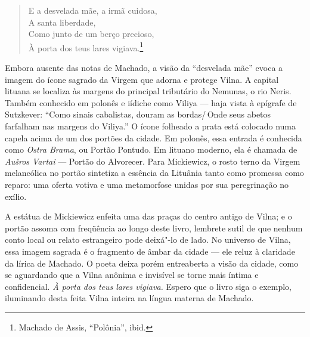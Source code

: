 \begin{verse}
E a desvelada mãe, a irmã cuidosa,\\
A santa liberdade,\\
Como junto de um berço precioso,\\
À porta dos teus lares vigiava.\footnote{Machado de Assis, ``Polônia'', ibid.}
\end{verse}

Embora ausente das notas de Machado, a visão da ``desvelada mãe'' evoca
a imagem do ícone sagrado da Virgem que adorna e protege Vilna. A
capital lituana se localiza às margens do principal tributário do
Nemunas, o rio Neris. Também conhecido em polonês e iídiche como Viliya
--- haja vista à epígrafe de Sutzkever: ``Como sinais cabalistas, douram
as bordas/\,Onde seus abetos farfalham nas margens do Viliya.'' O ícone
folheado a prata está colocado numa capela acima de um dos portões da
cidade. Em polonês, essa entrada é conhecida como \textit{Ostra Brama}, ou
Portão Pontudo. Em lituano moderno, ela é chamada de \textit{Aušros
Vartai} --- Portão do Alvorecer. Para Mickiewicz, o rosto terno da Virgem
melancólica no portão sintetiza a essência da Lituânia tanto como
promessa como reparo: uma oferta votiva e uma metamorfose unidas por sua
peregrinação no exílio. 

A estátua de Mickiewicz enfeita uma das praças
do centro antigo de Vilna; e o portão assoma com freqüência ao longo
deste livro, lembrete sutil de que nenhum conto local ou relato
estrangeiro pode deixá"-lo de lado. No universo de Vilna, essa imagem
sagrada é o fragmento de âmbar da cidade --- ele reluz à claridade da
lírica de Machado. O poeta deixa porém entreaberta a visão da cidade,
como se aguardando que a Vilna anônima e invisível se torne mais íntima
e confidencial. \textit{À porta dos teus lares vigiava.} Espero que o
livro siga o exemplo, iluminando desta feita Vilna inteira na língua
materna de Machado.